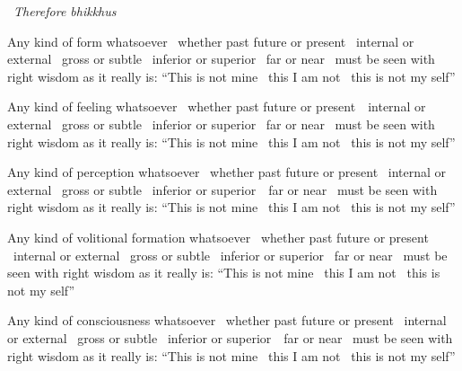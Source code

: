 \begin{english-only-leader}
  \anglebracketleft\ \hspace{-0.5mm}\textit{Therefore bhikkhus} \hspace{-0.5mm}\anglebracketright\
\end{english-only-leader}
\begin{english-only-hang-together}
  Any kind of form whatsoever \breathmark\ whether past future or present \breathmark\ internal or external \breathmark\ gross or subtle \breathmark\ inferior or superior \breathmark\ far or near \breathmark\ must be seen with right wisdom as it really is: ``This is not mine \breathmark\ this I am not \breathmark\ this is not my self''
\end{english-only-hang-together}

\begin{english-only-hang}
  Any kind of feeling whatsoever \breathmark\ whether past future or \mbox{present}~\breathmark\ internal or external \breathmark\ gross or subtle \breathmark\ inferior or superior \breathmark\ far or near \breathmark\ must be seen with right wisdom as it really is: ``This is not mine \breathmark\ this I am not \breathmark\ this is not my self''
\end{english-only-hang}

\begin{english-only-hang}
  Any kind of perception whatsoever \breathmark\ whether past future or present \breathmark\ internal or external \breathmark\ gross or subtle \breathmark\ inferior or \mbox{superior}~\breathmark\ far or near \breathmark\ must be seen with right wisdom as it really is: ``This is not mine \breathmark\ this I am not \breathmark\ this is not my self''
\end{english-only-hang}

\begin{english-only-hang}
  Any kind of volitional formation whatsoever \breathmark\ whether past future or present \breathmark\ internal or external \breathmark\ gross or subtle \breathmark\ inferior or superior \breathmark\ far or near \breathmark\ must be seen with right wisdom as it really is: ``This is not mine \breathmark\ this I am not \breathmark\ this is not my self''
\end{english-only-hang}

\begin{english-only-hang}
  Any kind of consciousness whatsoever \breathmark\ whether past future or present \breathmark\ internal or external \breathmark\ gross or subtle \breathmark\ inferior or \mbox{superior}~\breathmark\ far or near \breathmark\ must be seen with right wisdom as it really is: ``This is not mine \breathmark\ this I am not \breathmark\ this is not my self''
\end{english-only-hang}


